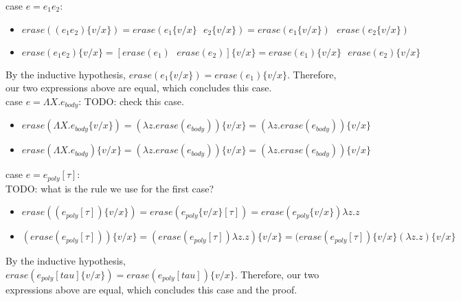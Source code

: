 \documentclass[10pt]{article}
\begin{document}
\begin{exercise}
{\sc case} $e = e_1e_2$:
\begin{itemize}
\item $\mathit{erase}((e_1e_2)\{v/x\}) = \mathit{erase}(e_1\{v/x\} \text{ } e_2\{v/x\}) =  \mathit{erase}(e_1\{v/x\})\text{ } \mathit{erase}(e_2\{v/x\})$
\item $\mathit{erase}(e_1e_2)\{v/x\} =  [\mathit{erase}(e_1)\text{ } \mathit{erase}(e_2)] \{v/x\} = \mathit{erase}(e_1)\{v/x\} \text{ } \mathit{erase}(e_2)\{v/x\}$\\
\end{itemize}

By the inductive hypothesis, $\mathit{erase}(e_1\{v/x\}) = \mathit{erase}(e_1)\{v/x\}$. Therefore, our two expressions above are equal, which concludes this case. \checkmark\\

{\sc case} $e = \Lambda X.e_{body}$: TODO: check this case.
\begin{itemize}
\item $\mathit{erase}(\Lambda X.e_{body}\{v/x\}) = (\lambda z. \mathit{erase}(e_{body}))\{v/x\} = (\lambda z. \mathit{erase}(e_{body})) \{v/x\}$
\item $\mathit{erase}(\Lambda X.e_{body})\{v/x\} = (\lambda z. \mathit{erase}(e_{body}))\{v/x\} = (\lambda z. \mathit{erase}(e_{body})) \{v/x\}$\\

\checkmark
\end{itemize}

{\sc case} $e = e_{poly}[\tau] $:\\

TODO: what is the rule we use for the first case?\\

\begin{itemize}
\item $\mathit{erase}((e_{poly}[\tau])\{v/x\}) = \mathit{erase}(e_{poly}\{v/x\}[\tau]) = \mathit{erase}(e_{poly} \{v/x\}) \lambda z.z$
\item $(\mathit{erase}(e_{poly}[\tau]))\{v/x\} = (\mathit{erase}(e_{poly}[\tau]) \lambda z.z)\{v/x\} = (\mathit{erase}(e_{poly}[\tau])\{v/x\} (\lambda z.z) \{v/x\}$\\
\end{itemize}

By the inductive hypothesis, $\mathit{erase}(e_{poly}[tau]\{v/x\}) = \mathit{erase}(e_{poly}[tau])\{v/x\}$. Therefore, our two expressions above are equal, which concludes this case and the proof. \checkmark\\



\end{exercise}
\end{document}
